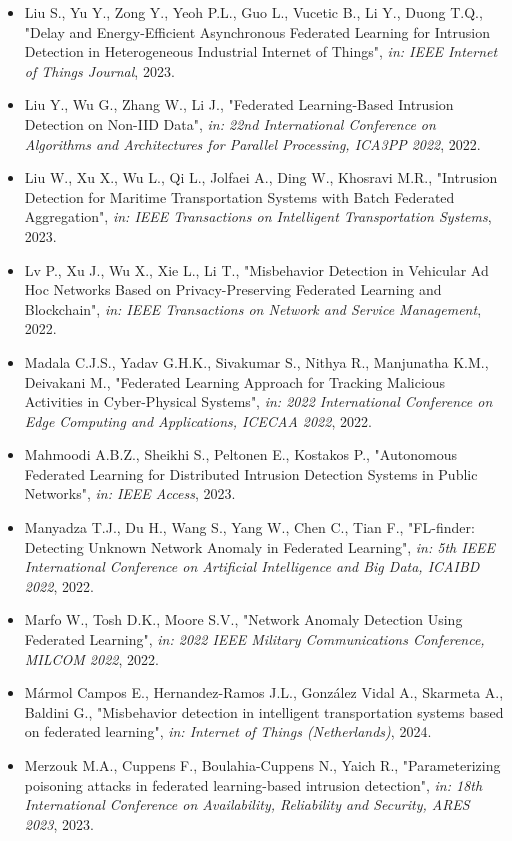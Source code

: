 \begin{itemize}
  \item Liu S., Yu Y., Zong Y., Yeoh P.L., Guo L., Vucetic B., Li Y., Duong T.Q., "Delay and Energy-Efficient Asynchronous Federated Learning for Intrusion Detection in Heterogeneous Industrial Internet of Things", \textit{in: IEEE Internet of Things Journal}, 2023.
  \item Liu Y., Wu G., Zhang W., Li J., "Federated Learning-Based Intrusion Detection on Non-IID Data", \textit{in: 22nd International Conference on Algorithms and Architectures for Parallel Processing, ICA3PP 2022}, 2022.
  \item Liu W., Xu X., Wu L., Qi L., Jolfaei A., Ding W., Khosravi M.R., "Intrusion Detection for Maritime Transportation Systems with Batch Federated Aggregation", \textit{in: IEEE Transactions on Intelligent Transportation Systems}, 2023.
  \item Lv P., Xu J., Wu X., Xie L., Li T., "Misbehavior Detection in Vehicular Ad Hoc Networks Based on Privacy-Preserving Federated Learning and Blockchain", \textit{in: IEEE Transactions on Network and Service Management}, 2022.
  \item Madala C.J.S., Yadav G.H.K., Sivakumar S., Nithya R., Manjunatha K.M., Deivakani M., "Federated Learning Approach for Tracking Malicious Activities in Cyber-Physical Systems", \textit{in: 2022 International Conference on Edge Computing and Applications, ICECAA 2022}, 2022.
  \item Mahmoodi A.B.Z., Sheikhi S., Peltonen E., Kostakos P., "Autonomous Federated Learning for Distributed Intrusion Detection Systems in Public Networks", \textit{in: IEEE Access}, 2023.
  \item Manyadza T.J., Du H., Wang S., Yang W., Chen C., Tian F., "FL-finder: Detecting Unknown Network Anomaly in Federated Learning", \textit{in: 5th IEEE International Conference on Artificial Intelligence and Big Data, ICAIBD 2022}, 2022.
  \item Marfo W., Tosh D.K., Moore S.V., "Network Anomaly Detection Using Federated Learning", \textit{in: 2022 IEEE Military Communications Conference, MILCOM 2022}, 2022.
  \item Mármol Campos E., Hernandez-Ramos J.L., González Vidal A., Skarmeta A., Baldini G., "Misbehavior detection in intelligent transportation systems based on federated learning", \textit{in: Internet of Things (Netherlands)}, 2024.
  \item Merzouk M.A., Cuppens F., Boulahia-Cuppens N., Yaich R., "Parameterizing poisoning attacks in federated learning-based intrusion detection", \textit{in: 18th International Conference on Availability, Reliability and Security, ARES 2023}, 2023.

\end{itemize}
